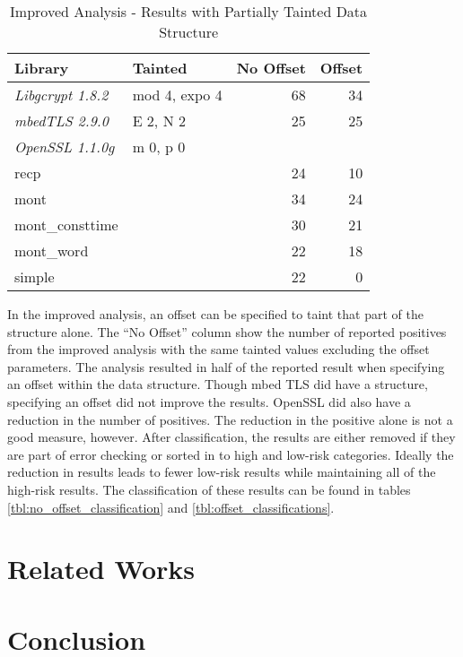 \documentclass[11pt,a4paper]{article}
\begin{document}
 \begin{table}
   \centering
   \caption{Improved Analysis - Results with Partially Tainted Data Structure}
   \begin{tabular}{|l|l|r|r|}
     \hline
     \textbf{Library} & \textbf{Tainted} & \textbf{No Offset} & \textbf{Offset} \\
     \hline
     \textit{Libgcrypt 1.8.2} & mod 4, expo 4 & 68 & 34 \\
     \textit{mbedTLS 2.9.0} & E 2, N 2 & 25 & 25 \\
     \textit{OpenSSL 1.1.0g} & m 0, p 0 & & \\
     recp & & 24 & 10 \\
     mont & & 34 & 24 \\
     mont\_consttime & & 30 & 21\\
     mont\_word & & 22 &  18 \\
     simple & & 22 & 0\\
     \hline
   \end{tabular}
   \label{tbl:improved_with_offset}
\end{table}

In the improved analysis, an offset can be specified to taint that part of the
structure alone. The ``No Offset'' column show the number of reported positives
from the improved analysis with the same tainted values excluding the offset
parameters. The analysis resulted in half of the reported result when specifying
an offset within the data structure. Though mbed TLS did have a structure,
specifying an offset did not improve the results. OpenSSL did also have a
reduction in the number of positives. The reduction in the positive alone is not
a good measure, however. After classification, the results are either removed
if they are part of error checking or sorted in to high and low-risk categories.
Ideally the reduction in results leads to fewer low-risk results while
maintaining all of the high-risk results. The classification of these results
can be found in tables \ref{tbl:no_offset_classification} and \ref{tbl:offset_classifications}.


 
\section{Related Works}

\section{Conclusion}

{}

\end{document}
